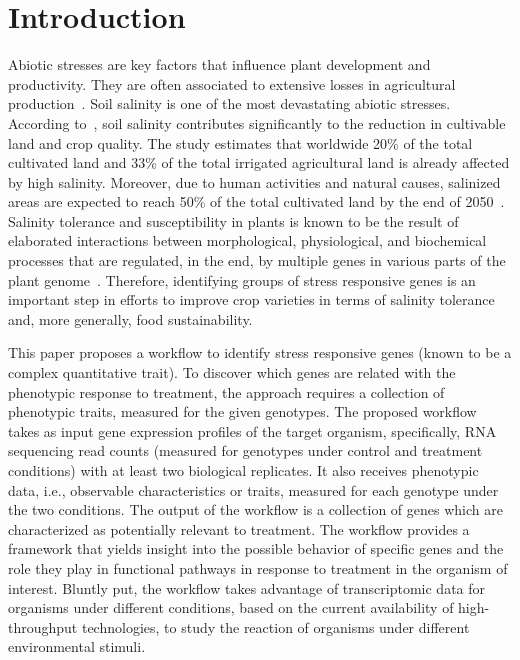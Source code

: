 \documentclass{bmcart}
\begin{document}

\section*{Introduction}
\label{sec.intro}

Abiotic stresses are key factors that influence plant
development and productivity. They are often associated to extensive
losses in agricultural production~\cite{mesterhazy2020losses}. 
Soil salinity is one of the
most devastating abiotic stresses. According to~\cite{shrivastava2015soil}, 
soil salinity contributes significantly to the reduction in cultivable
land and crop quality. The study estimates that worldwide 20\%
of the total cultivated land and 33\% of the total irrigated agricultural land
is already affected by high salinity. Moreover, due
to human activities and natural causes, salinized areas are
expected to reach 50\% of the total cultivated land by the
end of 2050~\cite{shrivastava2015soil}. Salinity tolerance and
susceptibility in plants is known to be the result of elaborated
interactions between morphological, physiological, and biochemical
processes that are regulated, in the end, by multiple genes in
various parts of the plant genome~\cite{reddy2017salt}. Therefore,
identifying groups of stress responsive genes is an important step in efforts to
improve crop varieties in terms of salinity tolerance and, more generally,
food sustainability.
\vspace{0.5cm}

This paper proposes a workflow to identify stress responsive genes
(known to be a complex quantitative trait).
To discover which genes are related with the phenotypic response to
treatment, the approach requires a collection of phenotypic
traits, measured for the given genotypes.  The proposed workflow takes as input
gene expression profiles of the target organism, specifically, 
RNA sequencing read counts (measured for genotypes under control
and treatment conditions)
with at least two biological replicates. It also receives phenotypic data, i.e., observable characteristics or traits, measured for each genotype under the two conditions. The output of the
workflow is a collection of genes which are characterized as potentially relevant
to treatment. The workflow provides a framework that yields insight into the possible behavior of specific
genes and the role they play in functional pathways in response to
treatment in the organism of interest. Bluntly put, the
workflow takes advantage of transcriptomic data for
organisms under different conditions, based on the current availability of
high-throughput technologies,
to study the reaction of organisms under different
environmental stimuli.
\vspace{0.5cm}
\end{document}
